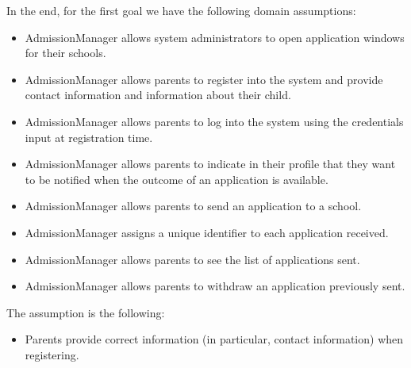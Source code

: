 \documentclass[12pt, a4paper]{report}
\begin{document}
\begin{enumerate}
                In the end, for the first goal we have the following domain assumptions: 
                \begin{itemize}
                    \item AdmissionManager allows system administrators to open application windows for their schools.
                    \item AdmissionManager allows parents to register into the system and provide contact information and information about their child. 
                    \item AdmissionManager allows parents to log into the system using the credentials input at registration time.
                    \item AdmissionManager allows parents to indicate in their profile that they want to be notified when the outcome of an application is available. 
                    \item AdmissionManager allows parents to send an application to a school. 
                    \item AdmissionManager assigns a unique identifier to each application received. 
                    \item AdmissionManager allows parents to see the list of applications sent.
                    \item AdmissionManager allows parents to withdraw an application previously sent.
                \end{itemize}
                The assumption is the following: 
                \begin{itemize}
                    \item Parents provide correct information (in particular, contact information) when registering.
                \end{itemize}


\end{enumerate}
\end{document}

